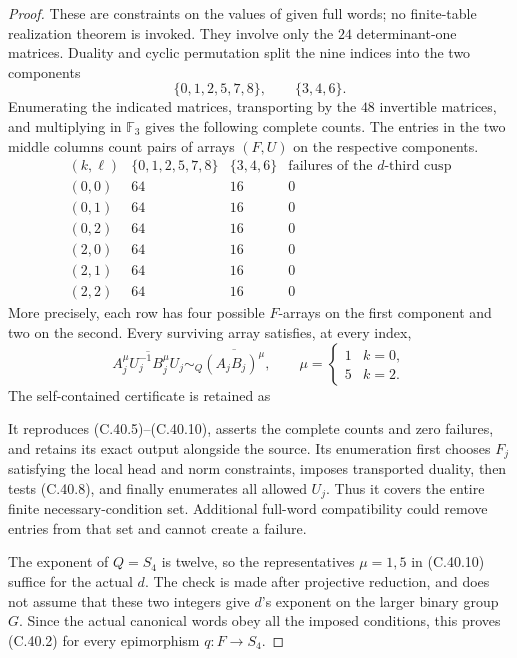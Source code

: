 \begin{proof}
These are constraints on the values of given full words;
no finite-table realization theorem is invoked.
They involve only the \(24\) determinant-one matrices.
Duality and cyclic permutation split the nine indices
into the two components
\[
          \{0,1,2,5,7,8\},\qquad \{3,4,6\}.
\]
Enumerating the indicated matrices, transporting by the
\(48\) invertible matrices, and multiplying in
\(\mathbb F_3\) gives the following complete counts.
The entries in the two middle columns count pairs of
arrays \((F,U)\) on the respective components.
\[
\begin{array}{c|c|c|c}
(k,\ell)&\{0,1,2,5,7,8\}&\{3,4,6\}
       &\text{failures of the }d\text{-third cusp}\\ \hline
(0,0)&64&16&0\\
(0,1)&64&16&0\\
(0,2)&64&16&0\\
(2,0)&64&16&0\\
(2,1)&64&16&0\\
(2,2)&64&16&0
\end{array}
 \tag{C.40.9}
\]
More precisely, each row has four possible \(F\)-arrays
on the first component and two on the second. Every
surviving array satisfies, at every index,
\[
 \overline{A_j^\mu U_j^{-1}B_j^\mu U_j}
       \sim_Q\overline{(A_jB_j)^\mu},
 \qquad
 \mu=\begin{cases}1&k=0,\\5&k=2.\end{cases}
 \tag{C.40.10}
\]
The self-contained certificate is retained as
\begin{quote}\small
{}
\end{quote}
It reproduces (C.40.5)--(C.40.10), asserts the complete counts
and zero failures, and retains its exact output alongside
the source. Its enumeration first chooses \(F_j\) satisfying
the local head and norm constraints, imposes transported
duality, then tests (C.40.8), and finally enumerates all
allowed \(U_j\). Thus it covers the entire finite
necessary-condition set. Additional full-word compatibility
could remove entries from that set and cannot create a failure.

The exponent of \(Q=S_4\) is twelve, so the representatives
\(\mu=1,5\) in (C.40.10) suffice for the actual \(d\).
The check is made after projective reduction, and does
not assume that these two integers give \(d\)'s exponent
on the larger binary group \(G\). Since the actual
canonical words obey all the imposed conditions, this
proves (C.40.2) for every epimorphism \(q:F\to S_4\).


\end{proof}
